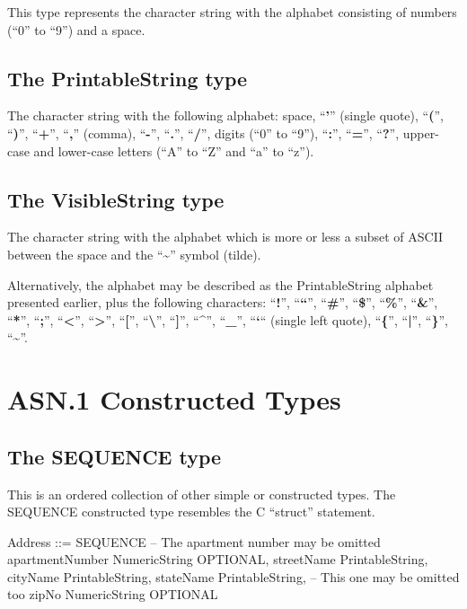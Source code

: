 \documentclass[english,oneside,12pt]{book}
\begin{document}
This type represents the character string with the alphabet consisting
of numbers (``0'' to ``9'') and a space.


\subsection{The PrintableString type}

The character string with the following alphabet: space, ``\textbf{'}''
(single quote), ``\textbf{(}'', ``\textbf{)}'', ``\textbf{+}'',
``\textbf{,}'' (comma), ``\textbf{-}'', ``\textbf{.}'', ``\textbf{/}'',
digits (``0'' to ``9''), ``\textbf{:}'', ``\textbf{=}'', ``\textbf{?}'',
upper-case and lower-case letters (``A'' to ``Z'' and ``a''
to ``z'').


\subsection{The VisibleString type}

The character string with the alphabet which is more or less a subset
of ASCII between the space and the ``\textbf{\textasciitilde{}}''
symbol (tilde).

Alternatively, the alphabet may be described as the PrintableString
alphabet presented earlier, plus the following characters: ``\textbf{!}'',
``\textbf{``}'', ``\textbf{\#}'', ``\textbf{\$}'', ``\textbf{\%}'',
``\textbf{\&}'', ``\textbf{*}'', ``\textbf{;}'', ``\textbf{<}'',
``\textbf{>}'', ``\textbf{{[}}'', ``\textbf{\textbackslash{}}'',
``\textbf{{]}}'', ``\textbf{\textasciicircum{}}'', ``\textbf{\_}'',
``\textbf{`}`` (single left quote), ``\textbf{\{}'', ``\textbf{|}'',
``\textbf{\}}'', ``\textbf{\textasciitilde{}}''.


\section{ASN.1 Constructed Types}


\subsection{The SEQUENCE type}

This is an ordered collection of other simple or constructed types.
The SEQUENCE constructed type resembles the C ``struct'' statement.
\begin{asn}
Address ::= SEQUENCE {
    -- The apartment number may be omitted
    apartmentNumber      NumericString OPTIONAL,
    streetName           PrintableString,
    cityName             PrintableString,
    stateName            PrintableString,
    -- This one may be omitted too
    zipNo                NumericString OPTIONAL
}
\end{asn}
\end{document}
